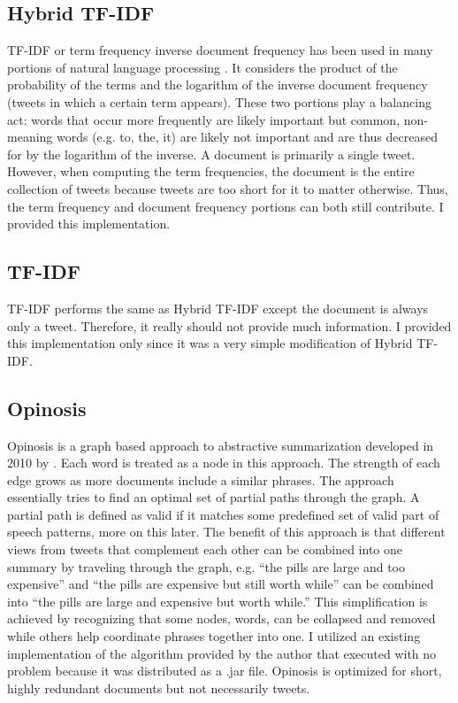 \documentclass[paper=letter, fontsize=12pt]{article}
\begin{document}
\subsection{Hybrid TF-IDF}
TF-IDF or term frequency inverse document frequency has been used in many portions of natural language processing \cite{Sarifi2010}. It considers the product of the probability of the terms and the logarithm of the inverse document frequency (tweets in which a certain term appears). These two portions play a balancing act: words that occur more frequently are likely important but common, non-meaning words (e.g. to, the, it) are likely not important and are thus decreased for by the logarithm of the inverse. A document is primarily a single tweet. However, when computing the term frequencies, the document is the entire collection of tweets because tweets are too short for it to matter otherwise. Thus, the term frequency and document frequency portions can both still contribute. I provided this implementation.

\subsection{TF-IDF}
TF-IDF performs the same as Hybrid TF-IDF except the document is always only a tweet. Therefore, it really should not provide much information. I provided this implementation only since it was a very simple modification of Hybrid TF-IDF. 

\subsection{Opinosis}
Opinosis is a graph based approach to abstractive summarization developed in 2010 by \cite{Ganesan2010}. Each word is treated as a node in this approach.  The strength of each edge grows as more documents include a similar phrases.  The approach essentially tries to find an optimal set of partial paths through the graph. A partial path is defined as valid if it matches some predefined set of valid part of speech patterns, more on this later. The benefit of this approach is that different views from tweets that complement each other can be combined into one summary by traveling through the graph, e.g. ``the pills are large and too expensive'' and ``the pills are expensive but still worth while'' can be combined into ``the pills are large and expensive but worth while.'' This simplification is achieved by recognizing that some nodes, words, can be collapsed and removed while others help coordinate phrases together into one. I utilized an existing implementation of the algorithm provided by the author that executed with no problem because it was distributed as a .jar file. Opinosis is optimized for short, highly redundant documents but not necessarily tweets. 
\end{document}
